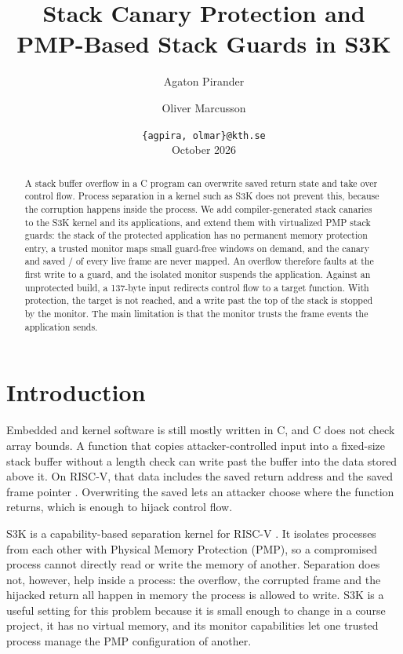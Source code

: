\documentclass[10pt,a4paper]{article}
\title{Stack Canary Protection and PMP-Based Stack Guards in S3K}
\author{
  Agaton Pirander \and Oliver Marcusson
}
\date{
  \texttt{\{agpira, olmar\}@kth.se}\\[0.5em]
  October 2026
}
\newcommand{\code}[1]{\texttt{\detokenize{#1}}}
\begin{document}
\maketitle
\sloppy

\begin{abstract}
A stack buffer overflow in a C program can overwrite saved return state and
take over control flow. Process separation in a kernel such as S3K does not
prevent this, because the corruption happens inside the process. We add
compiler-generated stack canaries to the S3K kernel and its applications, and
extend them with virtualized PMP stack guards: the stack of the protected
application has no permanent memory protection entry, a trusted monitor maps
small guard-free windows on demand, and the canary and saved
\code{ra}/\code{s0} of every live frame are never mapped. An overflow
therefore faults at the first write to a guard, and the isolated monitor
suspends the application. Against an unprotected build, a 137-byte input
redirects control flow to a target function. With protection, the target is
not reached, and a write past the top of the stack is stopped by the monitor.
The main limitation is that the monitor trusts the frame events the
application sends.
\end{abstract}

\section{Introduction}
\label{sec:introduction}

Embedded and kernel software is still mostly written in C, and C does not
check array bounds. A function that copies attacker-controlled input into a
fixed-size stack buffer without a length check can write past the buffer into
the data stored above it. On RISC-V, that data includes the saved return
address \code{ra} and the saved frame pointer \code{s0}. Overwriting the saved
\code{ra} lets an attacker choose where the function returns, which is enough
to hijack control flow.

S3K is a capability-based separation kernel for RISC-V \cite{s3k}. It
isolates processes from each other with Physical Memory Protection (PMP), so
a compromised process cannot directly read or write the memory of another.
Separation does not, however, help inside a process: the overflow, the
corrupted frame and the hijacked return all happen in memory the process is
allowed to write. S3K is a useful setting for this problem because it is
small enough to change in a course project, it has no virtual memory, and its
monitor capabilities let one trusted process manage the PMP configuration of
another.
\end{document}
